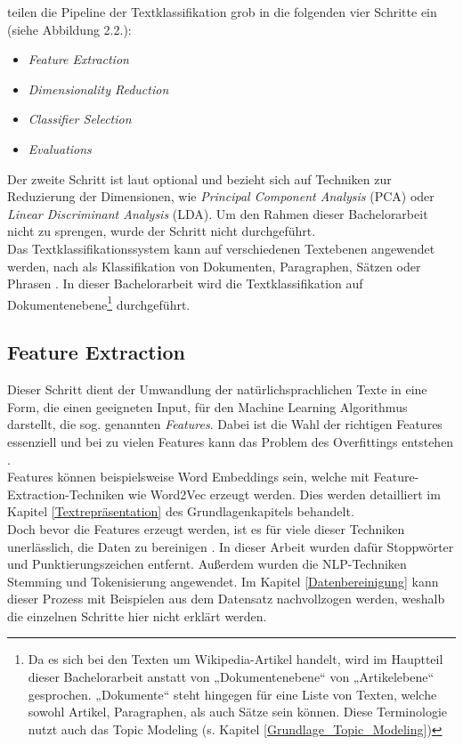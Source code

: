 \documentclass[ngerman]{ttlab-qualify}
\begin{document}
\noindent \textcite{Kowsari_2019} teilen die Pipeline der Textklassifikation grob in die folgenden vier Schritte ein (siehe Abbildung 2.2.):
\begin{itemize}
\item \textit{Feature Extraction}
\item \textit{Dimensionality Reduction}
\item \textit{Classifier Selection}
\item \textit{Evaluations}
\end{itemize} 
Der zweite Schritt ist laut \textcite{Kowsari_2019} optional und bezieht sich auf Techniken zur Reduzierung der Dimensionen, wie \textit{Principal Component Analysis} (PCA) oder \textit{Linear Discriminant Analysis} (LDA). Um den Rahmen dieser Bachelorarbeit nicht zu sprengen, wurde der Schritt nicht durchgeführt.\\
Das Textklassifikationssystem kann auf verschiedenen Textebenen angewendet werden, nach als Klassifikation von Dokumenten, Paragraphen, Sätzen oder Phrasen \parencite{Kowsari_2019}. In dieser Bachelorarbeit wird die Textklassifikation auf Dokumentenebene\footnote{Da es sich bei den Texten um Wikipedia-Artikel handelt, wird im Hauptteil dieser Bachelorarbeit anstatt von „Dokumentenebene“ von „Artikelebene“ gesprochen. „Dokumente“ steht hingegen für eine Liste von Texten, welche sowohl Artikel, Paragraphen, als auch Sätze sein können. Diese Terminologie nutzt auch das Topic Modeling (s. Kapitel \ref{Grundlage_Topic_Modeling})} durchgeführt.

\subsection{Feature Extraction}
Dieser Schritt dient der Umwandlung der natürlichsprachlichen Texte in eine Form, die einen geeigneten Input, für den Machine Learning Algorithmus darstellt, die sog. genannten \textit{Features}. Dabei ist die Wahl der richtigen Features essenziell und bei zu vielen Features kann das Problem des Overfittings entstehen \parencite{Kowsari_2019}.\\
Features können beispielsweise  Word Embeddings sein, welche mit Feature-Extraction-Techniken wie Word2Vec \parencite{Word2Vec} erzeugt werden. Dies werden detailliert im Kapitel \ref{Textrepräsentation} des Grundlagenkapitels behandelt.\\
Doch bevor die Features erzeugt werden, ist es für viele dieser Techniken unerlässlich, die Daten zu bereinigen \parencite{Kowsari_2019}. In dieser Arbeit wurden dafür Stoppwörter und Punktierungszeichen entfernt. Außerdem wurden die NLP-Techniken Stemming und Tokenisierung angewendet. Im Kapitel \ref{Datenbereinigung} kann dieser Prozess mit Beispielen aus dem Datensatz nachvollzogen werden, weshalb die einzelnen Schritte hier nicht erklärt werden.
\end{document}
